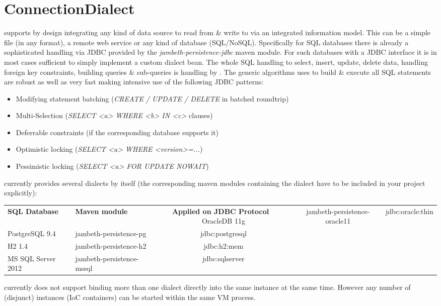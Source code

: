 \section{ConnectionDialect}
\label{feature:ConnectionDialect}
\ClearAPI

\AMBETH{} supports by design integrating any kind of data source to read from \& write to via an integrated information model. This can be a simple file (in any format), a remote web service or any kind of database (SQL/NoSQL). Specifically for SQL databases there is already a sophisticated handling via JDBC provided by the \textit{jambeth-persistence-jdbc} maven module. For such databases with a JDBC interface it is in most cases sufficient to simply implement a custom dialect bean. The whole SQL handling to select, insert, update, delete data, handling foreign key constraints, building queries \& sub-queries is handling by \AMBETH{}. The generic algorithms \AMBETH{} uses to build \& execute all SQL statements are robust as well as very fast making intensive use of the following JDBC patterns:

\begin{itemize}
	\item Modifying statement batching (\textit{CREATE / UPDATE / DELETE} in batched roundtrip)
	\item Multi-Selection (\textit{SELECT <a> WHERE <b> IN <c>} clauses)
	\item Deferrable constraints (if the corresponding database supports it)
	\item Optimistic locking (\textit{SELECT <a> WHERE <version>=...})
	\item Pessimistic locking (\textit{SELECT <a> FOR UPDATE NOWAIT})
\end{itemize}

\AMBETH{} currently provides several dialects by itself (the corresponding maven modules containing the dialect have to be included in your project explicitly):

\begin{longtable}{ l l c c c } \hline \textbf{SQL Database} & \textbf{Maven module} & \textbf{Applied on JDBC Protocol} \
	\endhead
	\hline
		OracleDB 11g				&	jambeth-persistence-oracle11	&	jdbc:oracle:thin	\\
		PostgreSQL 9.4			&	jambeth-persistence-pg				&	jdbc:postgresql		\\
		H2 1.4							& jambeth-persistence-h2				& jdbc:h2:mem				\\
		MS SQL Server 2012	& jambeth-persistence-mssql			& jdbc:sqlserver		\\
	\hline
\end{longtable}

\AMBETH{} currently does not support binding more than one dialect directly into the same \AMBETH{} instance at the same time. However any number of (disjunct) \AMBETH{} instances (IoC containers) can be started within the same VM process.